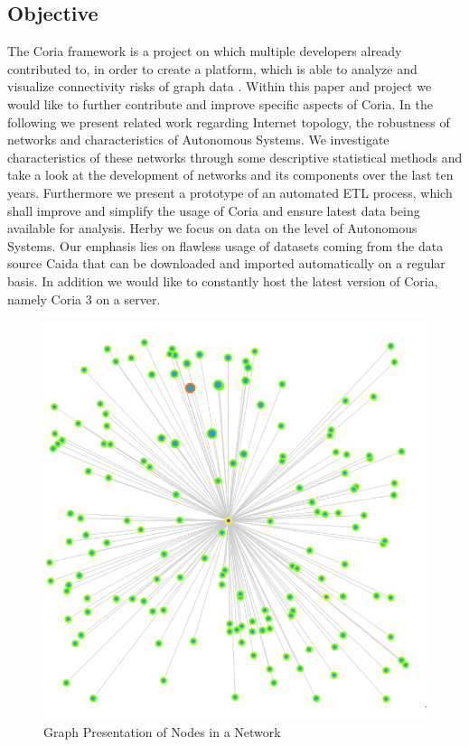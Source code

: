 \documentclass[conference, 11pt]{IEEEtran}
\begin{document}
\vspace{1cm}

   

\subsection{Objective}
The Coria framework is a project on which multiple developers already contributed to, in order to create a platform, which is able to analyze and visualize connectivity risks of graph data\cite{Coria} \cite{vulnerabilityBaumannFabian}. Within this paper and project we would like to further contribute and improve specific aspects of Coria. In the following we present related work regarding Internet topology, the robustness of networks and characteristics of Autonomous Systems. We investigate characteristics of these networks through some descriptive statistical methods and take a look at the development of networks and its components over the last ten years. Furthermore we present a prototype of an automated ETL process, which shall improve and simplify the usage of Coria and ensure latest data being available for analysis. Herby we focus on data on the level of Autonomous Systems. Our emphasis lies on flawless usage of datasets coming from the data source Caida that can be downloaded and imported automatically on a regular basis. In addition we would like to constantly host the latest version of Coria, namely Coria 3 on a server. \\


\vspace{0.5cm}
\begin{figure}[htbp]
\centerline{\includegraphics[scale=0.2]{Graphics/nodePresentaion.PNG}}
\caption{Graph Presentation of Nodes in a Network}
\label{fig}
\end{figure}
\vspace{0.5cm}
\end{document}
